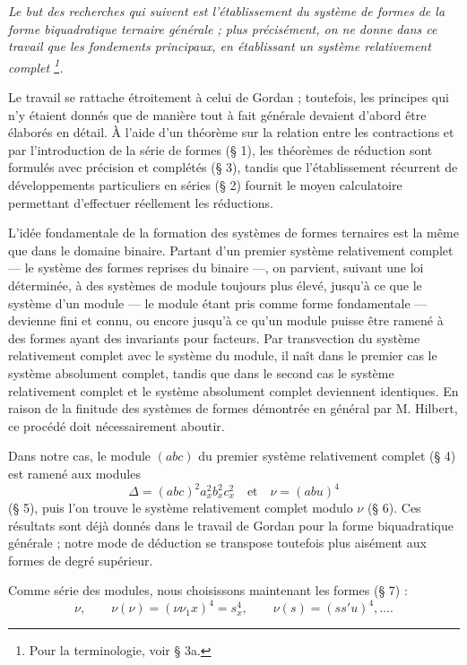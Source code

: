 \documentclass[11pt]{article}
\begin{document}
\emph{Le but des recherches qui suivent est l'établissement du système de formes de la forme biquadratique ternaire générale ; plus précisément, on ne donne dans ce travail que les fondements principaux, en établissant un \og{} système relativement complet \fg{}\footnote{Pour la terminologie, voir \S{} 3a.}.}

Le travail se rattache étroitement à celui de Gordan ; toutefois, les principes qui n'y étaient donnés que de manière tout à fait générale devaient d'abord être élaborés en détail. À l'aide d'un théorème sur la relation entre les contractions et par l'introduction de la \og{} série de formes \fg{} (\S{} 1), les théorèmes de réduction sont formulés avec précision et complétés (\S{} 3), tandis que l'établissement récurrent de développements particuliers en séries (\S{} 2) fournit le moyen calculatoire permettant d'effectuer réellement les réductions.

L'idée fondamentale de la formation des systèmes de formes ternaires est la même que dans le domaine binaire. Partant d'un premier système relativement complet --- le système des formes reprises du binaire ---, on parvient, suivant une loi déterminée, à des systèmes de module toujours plus élevé, jusqu'à ce que le système d'un module --- le module étant pris comme forme fondamentale --- devienne fini et connu, ou encore jusqu'à ce qu'un module puisse être ramené à des formes ayant des invariants pour facteurs. Par transvection du système relativement complet avec le système du module, il naît dans le premier cas le système absolument complet, tandis que dans le second cas le système relativement complet et le système absolument complet deviennent identiques. En raison de la finitude des systèmes de formes démontrée en général par M. Hilbert, ce procédé doit nécessairement aboutir.

Dans notre cas, le module $(abc)$ du premier système relativement complet (\S{} 4) est ramené aux modules
\[
\Delta=(abc)^2a_x^2b_x^2c_x^2\quad\text{et}\quad \nu=(abu)^4
\]
(\S{} 5), puis l'on trouve le système relativement complet modulo $\nu$ (\S{} 6). Ces résultats sont déjà donnés dans le travail de Gordan pour la forme biquadratique générale ; notre mode de déduction se transpose toutefois plus aisément aux formes de degré supérieur.

Comme série des modules, nous choisissons maintenant les formes (\S{} 7) :
\[
\nu,\qquad \nu(\nu)=(\nu\nu_1x)^4=s_x^4,\qquad \nu(s)=(ss'u)^4,\ldots .
\]
\end{document}
